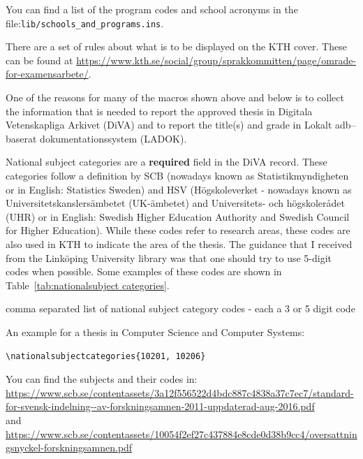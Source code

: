 \documentclass[main.tex]{subfiles}
\begin{document}
You can find a list of the program codes and school acronyms in the file:\linebreak[4] \texttt{lib/schools\_and\_programs.ins}.

There are a set of rules about what is to be displayed on the KTH cover. These can be found at \url{https://www.kth.se/social/group/sprakkommitten/page/omrade-for-examensarbete/}.

One of the reasons for many of the macros shown above and below is to collect the information that is needed to report the approved thesis in Digitala Vetenskapliga Arkivet (DiVA) and to report the title(s) and grade in \foreignlanguage{swedish}{Lokalt adb–baserat dokumentationssystem (LADOK)}.

National subject categories are a \textbf{required} field in the DiVA record. These categories follow a definition by \foreignlanguage{swedish}{SCB} (nowadays known as \foreignlanguage{swedish}{Statistikmyndigheten} or in English: Statistics Sweden) and HSV (\foreignlanguage{swedish}{Högskoleverket} - nowadays known as  \foreignlanguage{swedish}{Universitetskanslersämbetet (UK-ämbetet)} and \foreignlanguage{swedish}{Universitets- och högskolerådet (UHR)} or in English: Swedish Higher Education Authority and Swedish Council for Higher Education).
While these codes refer to research areas, these codes are also used in KTH to indicate the area of the thesis. The guidance that I received from the Linköping University library was that one should try to use 5-digit codes when possible. Some examples of these codes are shown in Table~\ref{tab:nationalsubject categories}.
\begin{description}[leftmargin=!, labelwidth =\widthof{\texttt{\textbackslash nationalsubjectcategories\{\}}}]
\item [\texttt{\textbackslash nationalsubjectcategories\{\}}] comma separated list of national subject category codes - each a 3 or 5 digit code
\end{description}

An example for a thesis in Computer Science and Computer Systems:
\begin{lstlisting}[style=latexExampleForAuthors]
\nationalsubjectcategories{10201, 10206}
\end{lstlisting}

You can find the subjects and their codes in:\\ \url{https://www.scb.se/contentassets/3a12f556522d4bdc887c4838a37c7ec7/standard-for-svensk-indelning--av-forskningsamnen-2011-uppdaterad-aug-2016.pdf}\\
and\\
\url{https://www.scb.se/contentassets/10054f2ef27c437884e8cde0d38b9cc4/oversattningsnyckel-forskningsamnen.pdf}
\end{document}
